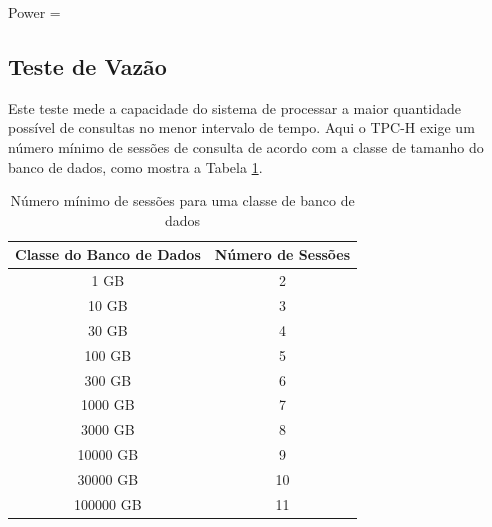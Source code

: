 \documentclass[conference]{IEEEtran}
\begin{document}
\begin{myequation}%
\label{eq:1}
{\scriptstyle Power = } {\scriptstyle {}} %
\end{myequation}
%

\subsection{Teste de Vazão}
\label{through_test}
Este teste mede a capacidade do sistema de processar a maior quantidade possível de consultas no menor intervalo de tempo. Aqui o TPC-H exige um número mínimo de sessões de consulta de acordo com a classe de tamanho do banco de dados, como mostra a Tabela \ref{min_sessions}.

\begin{table}[htpb]
\centering
\caption{Número mínimo de sessões para uma classe de banco de dados}
\label{min_sessions}
\begin{tabular}{|c|c|}
\hline
\multicolumn{1}{|c|}{\textbf{Classe do Banco de Dados}} & \textbf{Número de Sessões} \\ \hline
1 GB                                      & 2                            \\ \hline
10 GB                                      & 3                          \\ \hline
30 GB                                        & 4                             \\ \hline
100 GB                                        & 5                             \\ \hline
300 GB                                        & 6                             \\ \hline
1000 GB                                        & 7                             \\ \hline
3000 GB                                        & 8                             \\ \hline
10000 GB                                        & 9                             \\ \hline
30000 GB                                        & 10                             \\ \hline
100000 GB                                        & 11                             \\ \hline
\end{tabular}
\end{table}
\end{document}
